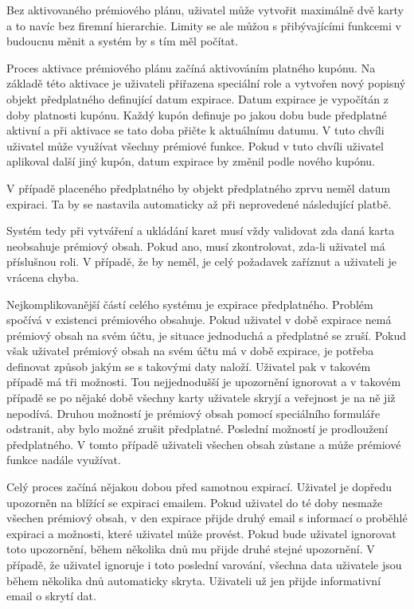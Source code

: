 		Bez aktivovaného prémiového plánu, uživatel může vytvořit maximálně dvě karty a to navíc bez firemní hierarchie.
		Limity se ale můžou s přibývajícími funkcemi v budoucnu měnit a systém by s tím měl počítat.

		Proces aktivace prémiového plánu začíná aktivováním platného kupónu.
		Na základě této aktivace je uživateli přiřazena speciální role a vytvořen nový popisný objekt předplatného
		definující datum expirace.
		Datum expirace je vypočítán z doby platnosti kupónu.
		Každý kupón definuje po jakou dobu bude předplatné aktivní a při aktivace se tato doba přičte k aktuálnímu datumu.
		V tuto chvíli uživatel může využívat všechny prémiové funkce.
		Pokud v tuto chvíli uživatel aplikoval další jiný kupón, datum expirace by změnil podle nového kupónu.

		V případě placeného předplatného by objekt předplatného zprvu neměl datum expiraci.
		Ta by se nastavila automaticky až při neprovedené následující platbě.

		Systém tedy při vytváření a ukládání karet musí vždy validovat zda daná karta neobsahuje prémiový obsah.
		Pokud ano, musí zkontrolovat, zda-li uživatel má příslušnou roli.
		V případě, že by neměl, je celý požadavek zaříznut a uživateli je vrácena chyba.

		Nejkomplikovanější částí celého systému je expirace předplatného.
		Problém spočívá v existenci prémiového obsahuje.
		Pokud uživatel v době expirace nemá prémiový obsah na svém účtu, je situace jednoduchá a předplatné se zruší.
		Pokud však uživatel prémiový obsah na svém účtu má v době expirace, je potřeba definovat způsob jakým se
		s takovými daty naloží.
		Uživatel pak v takovém případě má tři možnosti.
		Tou nejjednodušší je upozornění ignorovat a v takovém případě se po nějaké době všechny karty uživatele skryjí
		a veřejnost je na ně již nepodívá.
		Druhou možností je prémiový obsah pomocí speciálního formuláře odstranit, aby bylo možné zrušit předplatné.
		Poslední možností je prodloužení předplatného.
		V tomto případě uživateli všechen obsah zůstane a může prémiové funkce nadále využívat.

		Celý proces začíná nějakou dobou před samotnou expirací.
		Uživatel je dopředu upozorněn na blížící se expiraci emailem.
		Pokud uživatel do té doby nesmaže všechen prémiový obsah, v den expirace přijde druhý email s informací o
		proběhlé expiraci a možnosti, které uživatel může provést.
		Pokud bude uživatel ignorovat toto upozornění, během několika dnů mu přijde druhé stejné upozornění.
		V případě, že uživatel ignoruje i toto poslední varování, všechna data uživatele jsou během několika dnů
		automaticky skryta.
		Uživateli už jen přijde informativní email o skrytí dat.

